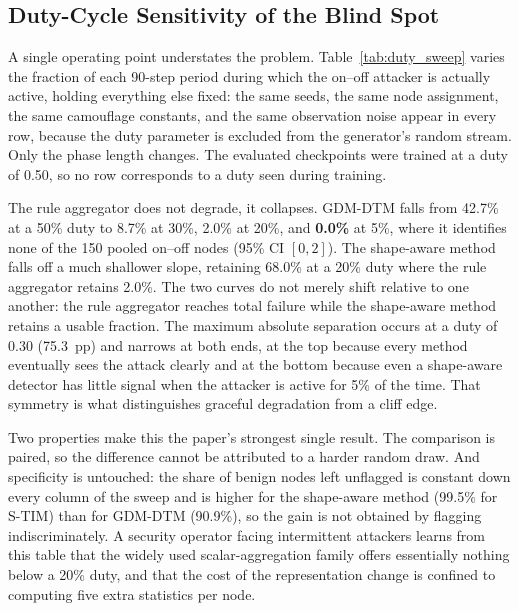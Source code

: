 \documentclass[notspecified,article,submit,moreauthors]{Definitions/mdpi}
\begin{document}
\subsection{Duty-Cycle Sensitivity of the Blind Spot}
\label{sec:duty}

A single operating point understates the problem. Table~\ref{tab:duty_sweep} varies the fraction of each 90-step period during which the on--off attacker is actually active, holding everything else fixed: the same seeds, the same node assignment, the same camouflage constants, and the same observation noise appear in every row, because the duty parameter is excluded from the generator's random stream. Only the phase length changes. The evaluated checkpoints were trained at a duty of 0.50, so no row corresponds to a duty seen during training.

The rule aggregator does not degrade, it collapses. GDM-DTM falls from 42.7\% at a 50\% duty to 8.7\% at 30\%, 2.0\% at 20\%, and \textbf{0.0\%} at 5\%, where it identifies none of the 150 pooled on--off nodes (95\% CI $[0,2]$). The shape-aware method falls off a much shallower slope, retaining 68.0\% at a 20\% duty where the rule aggregator retains 2.0\%. The two curves do not merely shift relative to one another: the rule aggregator reaches total failure while the shape-aware method retains a usable fraction. The maximum absolute separation occurs at a duty of 0.30 (75.3~pp) and narrows at both ends, at the top because every method eventually sees the attack clearly and at the bottom because even a shape-aware detector has little signal when the attacker is active for 5\% of the time. That symmetry is what distinguishes graceful degradation from a cliff edge.

Two properties make this the paper's strongest single result. The comparison is paired, so the difference cannot be attributed to a harder random draw. And specificity is untouched: the share of benign nodes left unflagged is constant down every column of the sweep and is higher for the shape-aware method (99.5\% for S-TIM) than for GDM-DTM (90.9\%), so the gain is not obtained by flagging indiscriminately. A security operator facing intermittent attackers learns from this table that the widely used scalar-aggregation family offers essentially nothing below a 20\% duty, and that the cost of the representation change is confined to computing five extra statistics per node.
\end{document}
